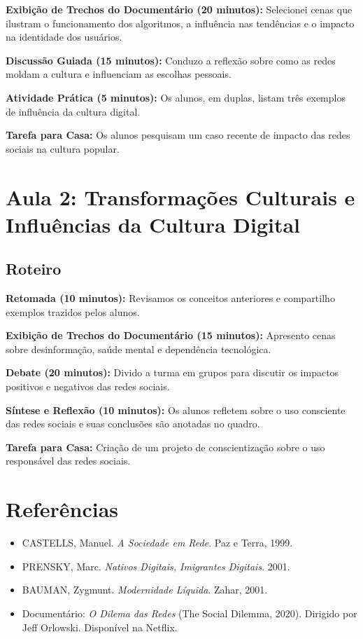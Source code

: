 \documentclass[a4paper,12pt]{article}
\begin{document}
\textbf{Exibição de Trechos do Documentário (20 minutos):} Selecionei cenas que ilustram o funcionamento dos algoritmos, a influência nas tendências e o impacto na identidade dos usuários.

\textbf{Discussão Guiada (15 minutos):} Conduzo a reflexão sobre como as redes moldam a cultura e influenciam as escolhas pessoais.

\textbf{Atividade Prática (5 minutos):} Os alunos, em duplas, listam três exemplos de influência da cultura digital.

\textbf{Tarefa para Casa:} Os alunos pesquisam um caso recente de impacto das redes sociais na cultura popular.

\section{Aula 2: Transformações Culturais e Influências da Cultura Digital}
\subsection{Roteiro}
\textbf{Retomada (10 minutos):} Revisamos os conceitos anteriores e compartilho exemplos trazidos pelos alunos.

\textbf{Exibição de Trechos do Documentário (15 minutos):} Apresento cenas sobre desinformação, saúde mental e dependência tecnológica.

\textbf{Debate (20 minutos):} Divido a turma em grupos para discutir os impactos positivos e negativos das redes sociais.

\textbf{Síntese e Reflexão (10 minutos):} Os alunos refletem sobre o uso consciente das redes sociais e suas conclusões são anotadas no quadro.

\textbf{Tarefa para Casa:} Criação de um projeto de conscientização sobre o uso responsável das redes sociais.

\section{Referências}
\begin{itemize}
    \item CASTELLS, Manuel. \textit{A Sociedade em Rede}. Paz e Terra, 1999.
    \item PRENSKY, Marc. \textit{Nativos Digitais, Imigrantes Digitais}. 2001.
    \item BAUMAN, Zygmunt. \textit{Modernidade Líquida}. Zahar, 2001.
    \item Documentário: \textit{O Dilema das Redes} (The Social Dilemma, 2020). Dirigido por Jeff Orlowski. Disponível na Netflix.
\end{itemize}
\end{document}

